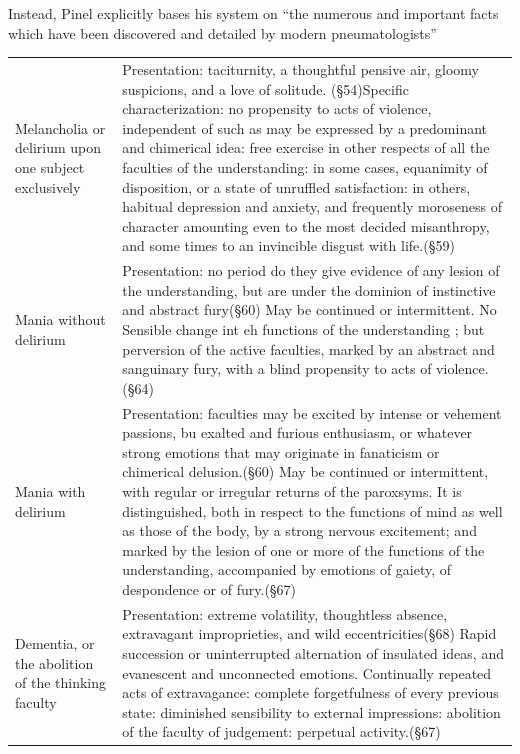 \begin{refsection}
Instead, Pinel explicitly bases his system on ``the numerous and important facts which have been discovered and detailed by modern pneumatologists'' ~\citep[p. 135]{Pinel:1806ws} 

 \begin{longtable}[!t]{ | P{2cm} | P{11cm}  | }
\hline
{}& \\ \hline 
Melancholia or delirium upon one subject exclusively&Presentation: taciturnity, a thoughtful pensive air, gloomy suspicions, and a love of solitude. (\S 54)\newline  Specific characterization: no propensity to acts of violence, independent of such as may be expressed by a predominant and chimerical idea: free exercise in other respects of all the faculties of the understanding: in some cases, equanimity of disposition, or a state of unruffled satisfaction: in others, habitual depression and anxiety, and frequently moroseness of character amounting even to the most decided misanthropy, and some times to an invincible disgust with life.(\S 59) \\ \hline
Mania without delirium&Presentation: no period do they give evidence of any lesion of the understanding, but are under the dominion of instinctive and abstract fury(\S 60) \newline
May be continued or intermittent. No Sensible change int eh functions of the understanding ; but perversion of the active faculties, marked by an abstract and sanguinary fury, with a blind propensity to acts of violence. (\S 64) \\ \hline
Mania with delirium&Presentation: faculties may be excited by intense or vehement passions, bu exalted and furious enthusiasm, or whatever strong emotions that may originate in fanaticism or chimerical delusion.(\S 60) \newline
May be continued or intermittent, with regular or irregular returns of the paroxsyms. It is distinguished, both in respect to the functions of mind as well as those of the body, by a strong nervous excitement; and marked by the lesion of one or more of the functions of the understanding, accompanied by emotions of gaiety, of despondence or of fury.(\S 67) \\ \hline
Dementia, or the abolition of the thinking faculty&Presentation: extreme volatility, thoughtless absence, extravagant improprieties, and wild eccentricities(\S 68) \newline
Rapid succession or uninterrupted alternation of insulated ideas, and evanescent and unconnected emotions. Continually repeated acts of extravagance: complete forgetfulness of every previous state: diminished sensibility to external impressions: abolition of the faculty of judgement: perpetual activity.(\S 67) \\ \hline

\end{longtable}
\end{refsection}
